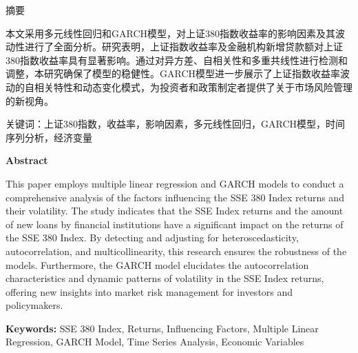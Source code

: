 \documentclass[12pt, a4paper]{article}
\numberwithin{equation}{section}
\begin{document}
\setcounter{page}{1}
\pagestyle{plain}

\newpage
\begin{center}
    {\heiti {} 摘要}
\end{center}

本文采用多元线性回归和GARCH模型，对上证380指数收益率的影响因素及其波动性进行了全面分析。研究表明，上证指数收益率及金融机构新增贷款额对上证380指数收益率具有显著影响。通过对异方差、自相关性和多重共线性进行检测和调整，本研究确保了模型的稳健性。GARCH模型进一步展示了上证指数收益率波动的自相关特性和动态变化模式，为投资者和政策制定者提供了关于市场风险管理的新视角。

\vspace{24pt} %

{\heiti {} 关键词：}上证380指数，收益率，影响因素，多元线性回归，GARCH模型，时间序列分析，经济变量

\vspace{36pt} %

\begin{center}
    {\bfseries \fontsize{18}{21.6} \selectfont Abstract}
\end{center}
\fontsize{12}{14.4} \selectfont

This paper employs multiple linear regression and GARCH models to conduct a comprehensive analysis of the factors influencing the SSE 380 Index returns and their volatility. The study indicates that the SSE Index returns and the amount of new loans by financial institutions have a significant impact on the returns of the SSE 380 Index. By detecting and adjusting for heteroscedasticity, autocorrelation, and multicollinearity, this research ensures the robustness of the models. Furthermore, the GARCH model elucidates the autocorrelation characteristics and dynamic patterns of volatility in the SSE Index returns, offering new insights into market risk management for investors and policymakers.

\vspace{24pt} %

{\bfseries \fontsize{12}{14.4} \selectfont Keywords:} SSE 380 Index, Returns, Influencing Factors, Multiple Linear Regression, GARCH Model, Time Series Analysis, Economic Variables

\renewcommand{\contentsname}{\centering \heiti \zihao{2} 目录}

\newpage
\setlength{\parskip}{0pt}
\tableofcontents

\newpage
\pagestyle{main}
\end{document}
